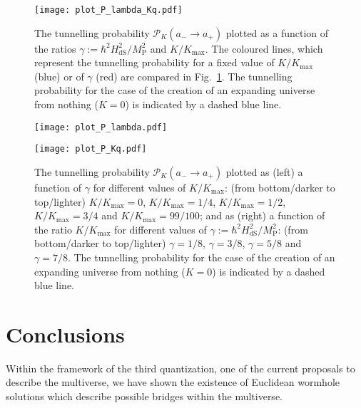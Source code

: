 \documentclass[aps,nofootinbib,prd,superscriptaddress,eqsecnum,showpacs,showkeys,preprintnumbers,altaffilletter]{revtex4}
\newcommand{\Kmax}{K_\text{max}}
\newcommand{\HdS}{H_\mathrm{dS}}
\begin{document}
\begin{figure} [t]
\begin{minipage}{.7\textwidth}
\texttt{[image: plot\_P\_lambda\_Kq.pdf]}
\end{minipage}
\caption{\label{tunfig}The tunnelling probability $\mathcal{P}_K(a_-\rightarrow a_+)$ plotted as a function of the ratios $\gamma := \hbar^2\HdS^2/M_\text{P}^2$ and $K/K_\mathrm{max}$. The coloured lines, which represent the tunnelling probability for a fixed value of $K/\Kmax$ (blue) or of $\gamma$ (red) are compared in Fig.~\ref{tunfig2}. The tunnelling probability for the case of the creation of an expanding universe from nothing ($K=0$) is indicated by a dashed blue line.}
\vspace{10pt}
\begin{minipage}{.495\textwidth}
\texttt{[image: plot\_P\_lambda.pdf]}
\end{minipage}
\hfill
\begin{minipage}{.495\textwidth}
  \centering
\texttt{[image: plot\_P\_Kq.pdf]}
\end{minipage}
\caption{\label{tunfig2}The tunnelling probability $\mathcal{P}_K(a_-\rightarrow a_+)$ plotted as (left)  a function of $\gamma$ for different values of $K/K_\mathrm{max}$: (from bottom/darker to top/lighter) $K/K_\mathrm{max}=0$, $K/K_\mathrm{max}=1/4$, $K/K_\mathrm{max}=1/2$, $K/K_\mathrm{max}=3/4$ and $K/K_\mathrm{max}=99/100$; and as (right) a function of the ratio $K/K_\mathrm{max}$ for different values of $\gamma := \hbar^2\HdS^2/M_\text{P}^2$: (from bottom/darker to top/lighter) $\gamma=1/8$, $\gamma=3/8$, $\gamma=5/8$ and $\gamma=7/8$. The tunnelling probability for the case of the creation of an expanding universe from nothing ($K=0$) is indicated by a dashed blue line.}
\end{figure}


%
%

\section{Conclusions}

Within the framework of the third quantization, one of the current proposals to describe the multiverse, we have shown the existence of Euclidean wormhole solutions which describe possible bridges within the multiverse. 
\end{document}
